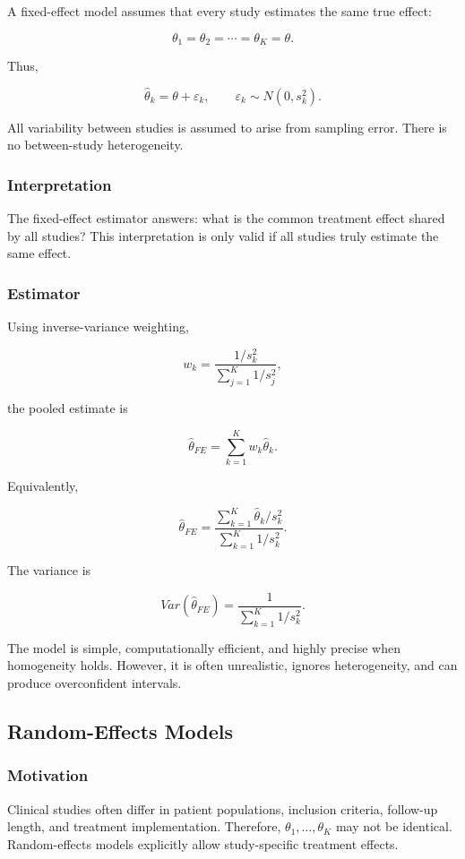\documentclass[11pt]{article}
\begin{document}
A fixed-effect model assumes that every study estimates the same true effect:

\[\theta_1=\theta_2=\cdots=\theta_K=\theta.\]

Thus,

\[\hat{\theta}_k=\theta+\varepsilon_k,\qquad \varepsilon_k\sim N(0,s_k^2).\]

All variability between studies is assumed to arise from sampling error. There is no between-study heterogeneity.

\subsubsection*{Interpretation}

The fixed-effect estimator answers: what is the common treatment effect shared by all studies?
This interpretation is only valid if all studies truly estimate the same effect.

\subsubsection*{Estimator}

Using inverse-variance weighting,

\[w_k=\frac{1/s_k^2}{\sum_{j=1}^{K}1/s_j^2},\]

the pooled estimate is

\[\hat{\theta}_{FE}=\sum_{k=1}^{K}w_k\hat{\theta}_k.\]

Equivalently,

\[\hat{\theta}_{FE}=\frac{\sum_{k=1}^{K}\hat{\theta}_k/s_k^2}{\sum_{k=1}^{K}1/s_k^2}.\]

The variance is

\[Var(\hat{\theta}_{FE})=\frac{1}{\sum_{k=1}^{K}1/s_k^2}.\]

The model is simple, computationally efficient, and highly precise when homogeneity holds. However, it is often unrealistic, ignores heterogeneity, and can produce overconfident intervals.

\subsection*{Random-Effects Models}

\subsubsection*{Motivation}

Clinical studies often differ in patient populations, inclusion criteria, follow-up length, and treatment implementation.
Therefore, $\theta_1,\ldots,\theta_K$ may not be identical. Random-effects models explicitly allow study-specific treatment effects.
\end{document}
